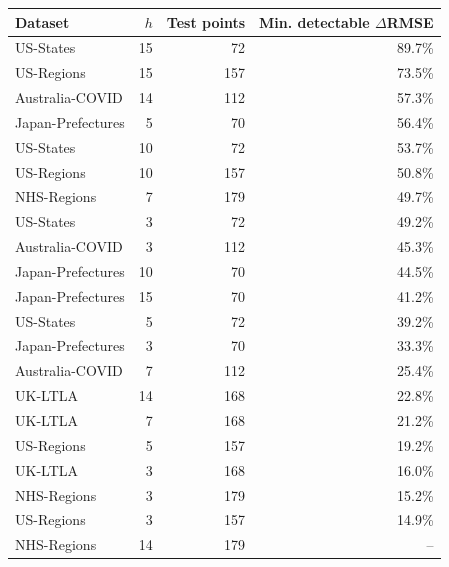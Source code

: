 \begin{tabular}{lrrr}
\hline
Dataset & $h$ & Test points & Min. detectable $\Delta$RMSE \\
\hline
US-States & 15 & 72 & 89.7\% \\
US-Regions & 15 & 157 & 73.5\% \\
Australia-COVID & 14 & 112 & 57.3\% \\
Japan-Prefectures & 5 & 70 & 56.4\% \\
US-States & 10 & 72 & 53.7\% \\
US-Regions & 10 & 157 & 50.8\% \\
NHS-Regions & 7 & 179 & 49.7\% \\
US-States & 3 & 72 & 49.2\% \\
Australia-COVID & 3 & 112 & 45.3\% \\
Japan-Prefectures & 10 & 70 & 44.5\% \\
Japan-Prefectures & 15 & 70 & 41.2\% \\
US-States & 5 & 72 & 39.2\% \\
Japan-Prefectures & 3 & 70 & 33.3\% \\
Australia-COVID & 7 & 112 & 25.4\% \\
UK-LTLA & 14 & 168 & 22.8\% \\
UK-LTLA & 7 & 168 & 21.2\% \\
US-Regions & 5 & 157 & 19.2\% \\
UK-LTLA & 3 & 168 & 16.0\% \\
NHS-Regions & 3 & 179 & 15.2\% \\
US-Regions & 3 & 157 & 14.9\% \\
NHS-Regions & 14 & 179 & -- \\
\hline
\end{tabular}
